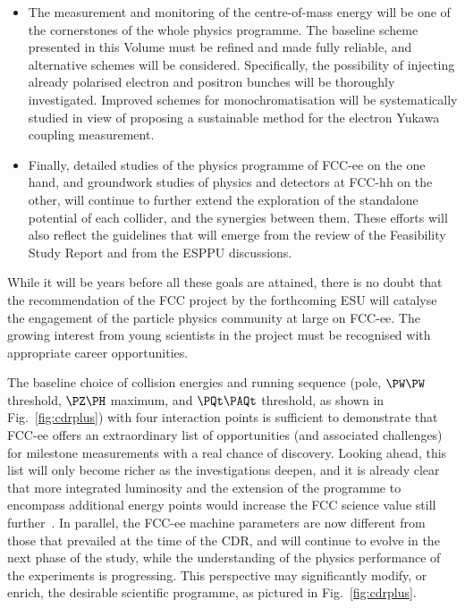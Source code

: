 \begin{itemize}
\item The measurement and monitoring of the centre-of-mass energy will be one of the cornerstones of the whole physics programme. The baseline scheme presented in this Volume must be refined and made fully reliable, and alternative schemes will be considered. Specifically, the possibility of injecting already polarised electron and positron bunches will be thoroughly investigated. Improved schemes for monochromatisation will be systematically studied in view of proposing a sustainable method for the electron Yukawa coupling measurement. 

\item Finally, detailed studies of the physics programme of FCC-ee on the one hand, 
and groundwork studies of physics and detectors at FCC-hh on the other, 
will continue to further extend the exploration of the standalone potential of each collider, 
and the synergies between them.
These efforts will also reflect 
the guidelines that will emerge from the review of the Feasibility Study Report and from the ESPPU discussions.

\end{itemize}
While it will be years before all these goals are attained, there is no doubt that the recommendation of the FCC project by the forthcoming ESU will catalyse the engagement of the particle physics community at large on FCC-ee. The growing interest from young scientists in the project must be recognised with appropriate career opportunities.

The baseline choice of collision energies and running sequence (\PZ pole, $\PW\PW$ threshold, $\PZ\PH$ maximum, and $\ttbar$ threshold, as shown in Fig.~\ref{fig:cdrplus}) with four interaction points is sufficient to demonstrate that FCC-ee offers an extraordinary list of opportunities (and associated challenges) for milestone measurements with a real chance of discovery. Looking ahead, this list will only become richer as the investigations deepen, and it is already clear that more integrated luminosity and the extension of the programme to encompass additional energy points would increase the FCC science value still further~\cite{note-FCCeeSequence}. In parallel, the FCC-ee machine parameters are now  different from  those that prevailed at the time of the CDR, and will continue to evolve in the next phase of the study, while the  understanding of the  physics performance of the experiments is progressing. This perspective may significantly modify, or enrich, the desirable scientific programme, as pictured in Fig.~\ref{fig:cdrplus}.

